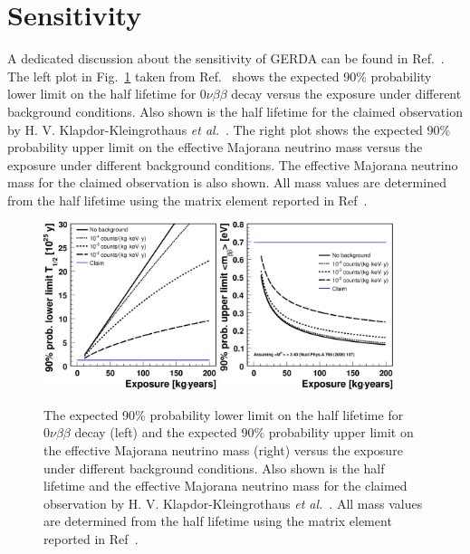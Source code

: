 \section{Sensitivity}
\label{sec:gerda:sens}
A dedicated discussion about the sensitivity of GERDA can be found
in Ref.~\cite{Cal06}. The left plot in Fig.~\ref{fig:gerda:limit}
taken from Ref.~\cite{Cal06} shows the expected 90\% probability lower
limit on the half lifetime for $0\nu\beta\beta$ decay versus the
exposure under different background conditions. Also shown is the half
lifetime for the claimed observation by H. V. Klapdor-Kleingrothaus
\textit{et al.}~\cite{Hei04}. The right plot shows the expected 90\%
probability upper limit on the effective Majorana neutrino mass versus
the exposure under different background conditions. The effective
Majorana neutrino mass for the claimed observation is also shown. All
mass values are determined from the half lifetime using the matrix
element reported in Ref~\cite{Rod07}.
\begin{figure}[tbhp]
  \centering
  \includegraphics[width=0.45\textwidth]{limit_halflife}  \hfil
  \includegraphics[width=0.45\textwidth]{limit_mass}
  \caption{The expected 90\% probability lower limit on the half    
lifetime for $0\nu\beta\beta$ decay (left) and the expected 90\%    
probability upper limit on the effective Majorana neutrino mass    
(right) versus the exposure under different background conditions.    
Also shown is the half lifetime and the effective Majorana    
neutrino mass for the claimed observation by H. V.    
Klapdor-Kleingrothaus \textit{et al.}~\cite{Hei04}. All mass    
values are determined from the half lifetime using the matrix    
element reported in Ref~\cite{Rod07}.}
  \label{fig:gerda:limit}
\end{figure}

